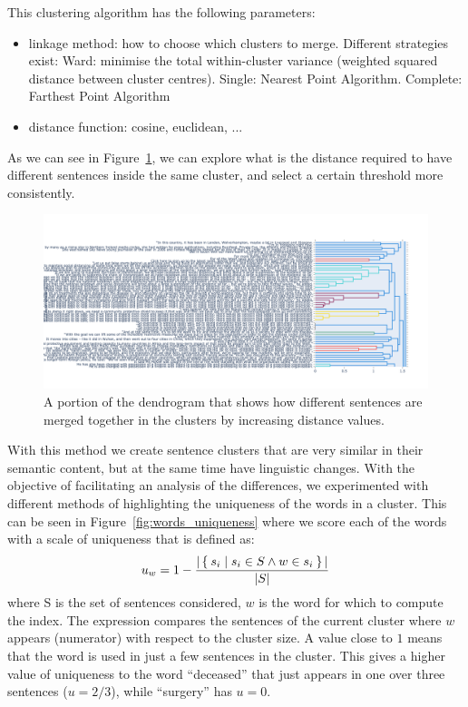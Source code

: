 This clustering algorithm has the following parameters:
\begin{itemize}
    \item linkage method: how to choose which clusters to merge. Different strategies exist: Ward: minimise the total within-cluster variance (weighted squared distance between cluster centres). Single: Nearest Point Algorithm. Complete: Farthest Point Algorithm
    \item distance function: cosine, euclidean, ...
\end{itemize}

As we can see in Figure~\ref{fig:dendrogram}, we can explore what is the distance required to have different sentences inside the same cluster, and select a certain threshold more consistently.
\begin{figure}[!htb]
    \centering
    \includegraphics[width=\linewidth]{figures/dendrogram.png}
    \caption{A portion of the dendrogram that shows how different sentences are merged together in the clusters by increasing distance values.}
    \label{fig:dendrogram}
\end{figure}


With this method we create sentence clusters that are very similar in their semantic content, but at the same time have linguistic changes.
With the objective of facilitating an analysis of the differences, we experimented with different methods of highlighting the uniqueness of the words in a cluster.
This can be seen in Figure~\ref{fig:words_uniqueness} where we score each of the words with a scale of uniqueness that is defined as:
$$u_w = 1 - \frac{|\Set{s_i | s_i \in S \land w \in s_i}|}{|S|}$$
where S is the set of sentences considered, $w$ is the word for which to compute the index. The expression compares the sentences of the current cluster where $w$ appears (numerator) with respect to the cluster size.
A value close to $1$ means that the word is used in just a few sentences in the cluster.
This gives a higher value of uniqueness to the word ``deceased'' that just appears in one over three sentences ($u = 2/3$), while ``surgery'' has $u = 0$.

